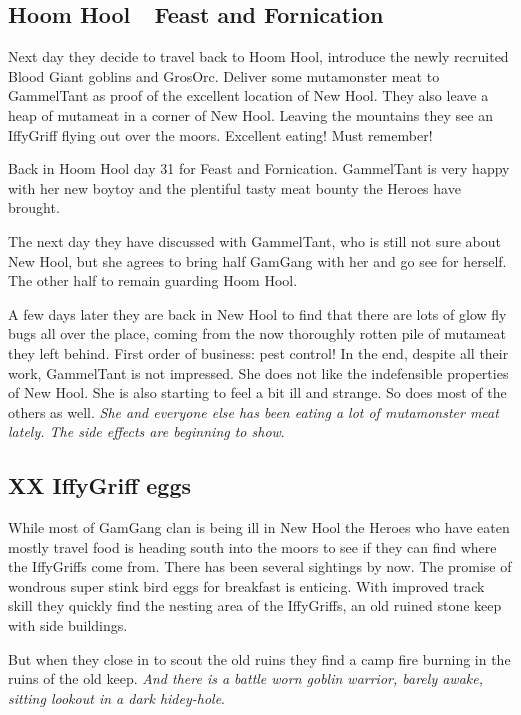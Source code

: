 \subsection*{Hoom Hool~\mdash~Feast and Fornication}

Next day they decide to travel back to Hoom Hool, introduce the newly recruited Blood Giant goblins and GrosOrc. Deliver some mutamonster meat to GammelTant as proof of the excellent location of New Hool. They also leave a heap of mutameat in a corner of New Hool. Leaving the mountains they see an IffyGriff flying out over the moors. Excellent eating! Must remember!

Back in Hoom Hool day 31 for Feast and Fornication. GammelTant is very happy with her new boytoy and the plentiful tasty meat bounty the Heroes have brought.

The next day they have discussed with GammelTant, who is still not sure about New Hool, but she agrees to bring half GamGang with her and go see for herself. The other half to remain guarding Hoom Hool.

A few days later they are back in New Hool to find that there are lots of glow fly bugs all over the place, coming from the now thoroughly rotten pile of mutameat they left behind. First order of business: pest control! 
In the end, despite all their work, GammelTant is not impressed. She does not like the indefensible properties of New Hool. She is also starting to feel a bit ill and strange. So does most of the others as well. \textit{She and everyone else has been eating a lot of mutamonster meat lately. The side effects are beginning to show}.


\subsection*{XX IffyGriff eggs}

While most of GamGang clan is being ill in New Hool the Heroes who have eaten mostly travel food is heading south into the moors to see if they can find where the IffyGriffs come from. There has been several sightings by now. The promise of wondrous super stink bird eggs for breakfast is enticing. With improved track skill they quickly find the nesting area of the IffyGriffs, an old ruined stone keep with side buildings.

But when they close in to scout the old ruins they find a camp fire burning in the ruins of the old keep. \textit{And there is a battle worn goblin warrior, barely awake, sitting lookout in a dark hidey-hole}.

